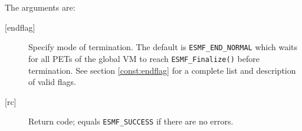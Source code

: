        The arguments are:
       \begin{description}
       \item [{[endflag]}]
             Specify mode of termination. The default is {\tt ESMF\_END\_NORMAL}
             which waits for all PETs of the global VM to reach 
             {\tt ESMF\_Finalize()} before termination. See section 
             \ref{const:endflag} for a complete list and description of
             valid flags.
       \item [{[rc]}]
             Return code; equals {\tt ESMF\_SUCCESS} if there are no errors.
       \end{description}
  
\setlength{\parskip}{\oldparskip}
\setlength{\parindent}{\oldparindent}
\setlength{\baselineskip}{\oldbaselineskip}
